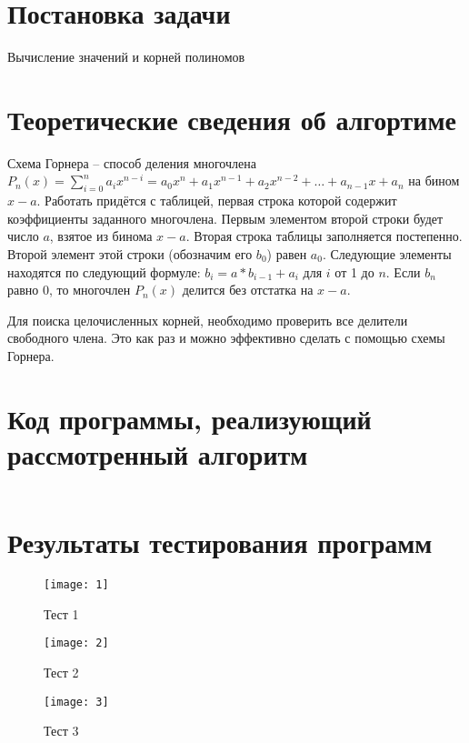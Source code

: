 \documentclass[spec, och, labwork]{shiza}
\begin{document}
\tableofcontents

\section{Постановка задачи}

Вычисление значений и корней полиномов

\section{Теоретические сведения об алгортиме}

Схема Горнера – способ деления многочлена
$P_n(x)=\sum\limits_{i=0}^{n}a_{i}x^{n-i}=a_{0}x^{n}+a_{1}x^{n-1}+a_{2}x^{n-2}+\ldots+a_{n-1}x+a_n$
на бином $x - a$. Работать придётся с таблицей, первая строка которой содержит коэффициенты заданного 
многочлена. Первым элементом второй строки будет число $a$, взятое из бинома $x - a$. 
Вторая строка таблицы заполняется постепенно. Второй элемент этой строки (обозначим его 
$b_0$) равен $a_0$. Следующие элементы находятся по следующий формуле:
$b_i = a * b_{i-1} + a_i$ для $i$ от 1 до $n$. Если $b_n$ равно 0, то многочлен $P_n(x)$ делится без
отстатка на $x - a$.

Для поиска целочисленных корней, необходимо проверить все делители свободного члена. Это как
раз и можно эффективно сделать с помощью схемы Горнера.


\section{Код программы, реализующий рассмотренный алгоритм}

   \inputminted[fontsize=\small]{scala}{../code/task15.scala}
    
\section{Результаты тестирования программ}

        \begin{figure}[H]
            \centering      %
            \texttt{[image: 1]}
            \caption{Тест 1}
            \label{fig:image1}
        \end{figure}
        
        \begin{figure}[H]
            \centering      %
            \texttt{[image: 2]}
            \caption{Тест 2}
            \label{fig:image1}
        \end{figure}

        \begin{figure}[H]
            \centering      %
            \texttt{[image: 3]}
            \caption{Тест 3}
            \label{fig:image1}
        \end{figure}
\end{document}
